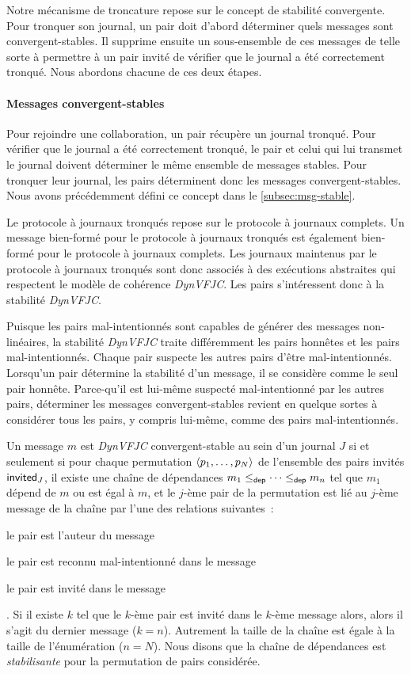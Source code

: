 Notre mécanisme de troncature repose sur le concept de stabilité convergente.
Pour tronquer son journal, un pair doit d'abord déterminer quels messages sont convergent-stables.
Il supprime ensuite un sous-ensemble de ces messages de telle sorte à permettre à un pair invité de vérifier que le journal a été correctement tronqué.
Nous abordons chacune de ces deux étapes.

\paragraph{Messages convergent-stables}
Pour rejoindre une collaboration, un pair récupère un journal tronqué.
Pour vérifier que le journal a été correctement tronqué, le pair et celui qui lui transmet le journal doivent déterminer le même ensemble de messages stables.
Pour tronquer leur journal, les pairs déterminent donc les messages convergent-stables.
Nous avons précédemment défini ce concept dans le \autoref{subsec:msg-stable}.

Le protocole à journaux tronqués repose sur le protocole à journaux complets.
Un message bien-formé pour le protocole à journaux tronqués est également bien-formé pour le protocole à journaux complets.
Les journaux maintenus par le protocole à journaux tronqués sont donc associés à des exécutions abstraites qui respectent le modèle de cohérence \emph{DynVFJC}.
Les pairs s'intéressent donc à la stabilité \emph{DynVFJC}.

Puisque les pairs mal-intentionnés sont capables de générer des messages non-linéaires, la stabilité \emph{DynVFJC} traite différemment les pairs honnêtes et les pairs mal-intentionnés.
Chaque pair suspecte les autres pairs d'être mal-intentionnés.
Lorsqu'un pair détermine la stabilité d'un message, il se considère comme le seul pair honnête.
Parce-qu'il est lui-même suspecté mal-intentionné par les autres pairs, déterminer les messages convergent-stables revient en quelque sortes à considérer tous les pairs, y compris lui-même, comme des pairs mal-intentionnés.

Un message $m$ est \emph{DynVFJC} convergent-stable au sein d'un journal $J$ si et seulement si pour chaque permutation $\langle p_1, \dotsc, p_N\rangle$ de l'ensemble des pairs invités $\operatorname{\mathsf{invited}}_J$, il existe une chaîne de dépendances $m_1 \leq_{\operatorname{\mathsf{dep}}} \dotsb \leq_{\operatorname{\mathsf{dep}}} m_n$ tel que $m_1$ dépend de $m$ ou est égal à $m$, et le $j$-ème pair de la permutation est lié au $j$-ème message de la chaîne par l'une des relations suivantes~: \begin{inlinelist}
    \item le pair est l'auteur du message
    \item le pair est reconnu mal-intentionné dans le message
    \item le pair est invité dans le message
\end{inlinelist}.
Si il existe $k$ tel que le $k$-ème pair est invité dans le $k$-ème message alors, alors il s'agit du dernier message ($k = n$).
Autrement la taille de la chaîne est égale à la taille de l'énumération ($n = N$).
Nous disons que la chaîne de dépendances est \emph{stabilisante} pour la permutation de pairs considérée.

